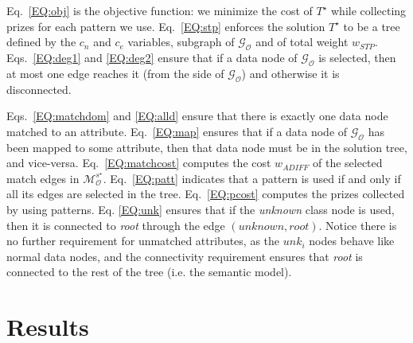 \documentclass[letterpaper]{article} %
\newcommand{\ignore}[1]{}
\newcommand{\forijcai}[1]{}
\begin{document}
Eq.~\ref{EQ:obj} is the objective function: we minimize the cost 
of $T^\star$ while collecting prizes for each pattern we use. 
Eq.~\ref{EQ:stp} enforces the solution 
$T^\star$ to be a tree defined by the $c_n$ and $c_e$ variables,
subgraph of $\mathcal{G_O}$ %
and of total weight $w_{STP}$. 
Eqs.~\ref{EQ:deg1} and \ref{EQ:deg2} ensure 
that if a data node of $\mathcal{G_O}$ is selected, then at most one edge 
reaches it (from the side of $\mathcal{G_O}$) and otherwise it is 
disconnected. 
\ignore{Eq. \ref{EQ:matchdom} ensures that the domain of each 
variable in 
the array $match$ corresponds to a subset of data nodes of $\mathcal{G_O}$ 
for which there is an edge connecting to the attribute at hand. 
Eq.~\ref{EQ:alld} ensure that each attribute is mapped to exactly one data node of 
$\mathcal{G_O}$.}
Eqs.~\ref{EQ:matchdom} and \ref{EQ:alld} ensure that 
there is exactly one data node matched to an attribute. 
Eq.~\ref{EQ:map} ensures that 
if a data node of $\mathcal{G_O}$ has been mapped to some attribute, then 
that data node must be in the solution tree, and vice-versa. 
Eq.~\ref{EQ:matchcost} computes the cost $w_{ADIFF}$ of the selected match edges in $\mathcal{M}^{s^\star}_\mathcal{O}$.
Eq.~\ref{EQ:patt} indicates that a pattern is used if and only if all its edges are selected in the tree. 
Eq.~\ref{EQ:pcost} computes the prizes collected by using patterns.
Eq. \ref{EQ:unk} ensures that if the \emph{unknown} class node is used, then it 
is connected to \emph{root} through the edge $(\mathit{unknown},\mathit{root})$.
Notice there is no further requirement for unmatched attributes, as the 
$unk_i$ nodes behave like normal data nodes, and the connectivity 
requirement ensures that \emph{root} is connected to the rest of the 
tree (i.e. the semantic model).

\forijcai{
Note how this CP model is easy to adapt to more classic settings where no 
patterns are used (by dropping Eqs. \ref{EQ:patt} and \ref{EQ:pcost}), or 
without \emph{unknown} nodes (by dropping Eq. \ref{EQ:unk}).

We choose a search strategy that will first try to match attributes using the cheapest edges in $\mathcal{M}_\mathcal{O}^{s^\star}$. Then, it will try to use the cheapest unfixed edge $e\in\mathcal{E_O}$ that fills a pattern $p$ (i.e. $\forall e_p\in p, e_p \neq e, c_{e_p}$) such that $w_\mathcal{P}(p) > w_\mathcal{O}(e)$ or simply the cheapest edge if none fill a pattern.
}

\section{Results \label{SEC:Res}}
\end{document}
